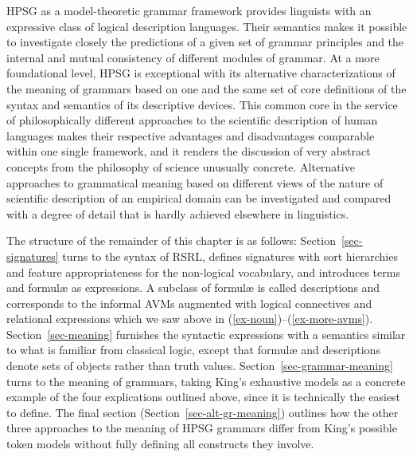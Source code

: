 \documentclass[output=paper
 	        ,biblatex
                ,babelshorthands
                ,newtxmath
                ,draftmode
                ,colorlinks, citecolor=brown
]{langscibook}
\begin{document}
{HPSG as a model-theoretic grammar framework provides linguists with an
expressive class of logical description languages. Their semantics
makes it possible to investigate closely the predictions of a given
set of grammar principles and the internal and mutual consistency
of different modules of grammar. At a more foundational level, HPSG is
exceptional with its alternative characterizations of the meaning of
grammars based on one and the same set of core definitions of the
syntax and semantics of its descriptive devices. This common core in
the service of
philosophically different approaches to the scientific description of
human languages makes their respective advantages and disadvantages
comparable within one single framework, and it renders the discussion
of very abstract concepts from the philosophy of science unusually concrete.  Alternative approaches
to grammatical meaning based on different views of the nature of
scientific description of an empirical domain can be investigated and
compared with a degree of detail that is hardly achieved elsewhere in
linguistics.




The structure of the remainder of this chapter is as follows:
Section~\ref{sec-signatures} turns to the syntax of RSRL, defines
signatures with sort hierarchies and feature appropriateness for the
non-logical vocabulary, and introduces terms and formulæ as
expressions. A subclass of formulæ is called
descriptions and corresponds to the informal
AVMs augmented with logical connectives and relational
expressions which we saw above in (\ref{ex-noun})--(\ref{ex-more-avms}). Section~\ref{sec-meaning} furnishes the syntactic expressions
with a semantics similar to what is familiar from classical logic,
except that formulæ and descriptions denote sets of objects rather than truth
values. Section~\ref{sec-grammar-meaning} turns to the meaning of
grammars, taking King's exhaustive models as a concrete example of the
four explications outlined above, since it is technically the easiest
to define.  The final section (Section~\ref{sec-alt-gr-meaning})
outlines how the other three approaches to the meaning of HPSG grammars
differ from King's possible token models without fully defining all constructs
they involve.

}
\end{document}
